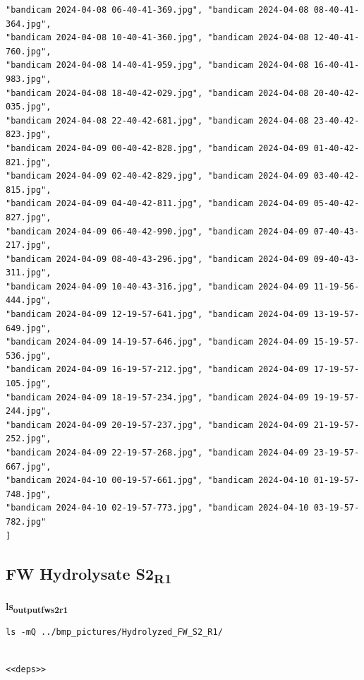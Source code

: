 \documentclass[11pt]{article}
\begin{document}
\begin{verbatim}
"bandicam 2024-04-08 06-40-41-369.jpg", "bandicam 2024-04-08 08-40-41-364.jpg",
"bandicam 2024-04-08 10-40-41-360.jpg", "bandicam 2024-04-08 12-40-41-760.jpg",
"bandicam 2024-04-08 14-40-41-959.jpg", "bandicam 2024-04-08 16-40-41-983.jpg",
"bandicam 2024-04-08 18-40-42-029.jpg", "bandicam 2024-04-08 20-40-42-035.jpg",
"bandicam 2024-04-08 22-40-42-681.jpg", "bandicam 2024-04-08 23-40-42-823.jpg",
"bandicam 2024-04-09 00-40-42-828.jpg", "bandicam 2024-04-09 01-40-42-821.jpg",
"bandicam 2024-04-09 02-40-42-829.jpg", "bandicam 2024-04-09 03-40-42-815.jpg",
"bandicam 2024-04-09 04-40-42-811.jpg", "bandicam 2024-04-09 05-40-42-827.jpg",
"bandicam 2024-04-09 06-40-42-990.jpg", "bandicam 2024-04-09 07-40-43-217.jpg",
"bandicam 2024-04-09 08-40-43-296.jpg", "bandicam 2024-04-09 09-40-43-311.jpg",
"bandicam 2024-04-09 10-40-43-316.jpg", "bandicam 2024-04-09 11-19-56-444.jpg",
"bandicam 2024-04-09 12-19-57-641.jpg", "bandicam 2024-04-09 13-19-57-649.jpg",
"bandicam 2024-04-09 14-19-57-646.jpg", "bandicam 2024-04-09 15-19-57-536.jpg",
"bandicam 2024-04-09 16-19-57-212.jpg", "bandicam 2024-04-09 17-19-57-105.jpg",
"bandicam 2024-04-09 18-19-57-234.jpg", "bandicam 2024-04-09 19-19-57-244.jpg",
"bandicam 2024-04-09 20-19-57-237.jpg", "bandicam 2024-04-09 21-19-57-252.jpg",
"bandicam 2024-04-09 22-19-57-268.jpg", "bandicam 2024-04-09 23-19-57-667.jpg",
"bandicam 2024-04-10 00-19-57-661.jpg", "bandicam 2024-04-10 01-19-57-748.jpg",
"bandicam 2024-04-10 02-19-57-773.jpg", "bandicam 2024-04-10 03-19-57-782.jpg"
]
\end{verbatim}

\subsection{FW Hydrolysate S2\textsubscript{R1}}
\label{sec:org22fb3d2}
\textbf{ls\textsubscript{output}\textsubscript{fw}\textsubscript{s2}\textsubscript{r1}}
\begin{verbatim}
ls -mQ ../bmp_pictures/Hydrolyzed_FW_S2_R1/
\end{verbatim}

\begin{verbatim}

<<deps>>

\end{verbatim}
\end{document}
